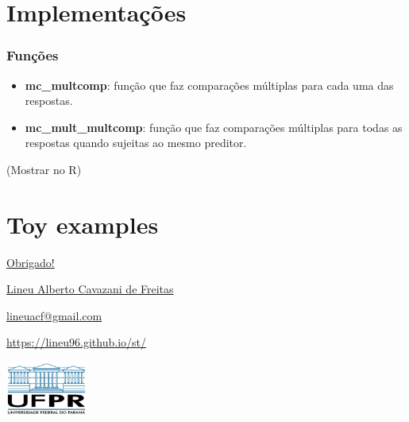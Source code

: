 \documentclass[10pt,
  aspectratio=169,
  serif,
  mathserif,
  professionalfont,
  compress,
  handout,
  ]{beamer}\usepackage[]{graphicx}\usepackage[]{color}
\begin{document}
\section{Implementações}

\begin{frame}

\frametitle{Funções}

\begin{itemize}
    \itemsep 2ex

  \item \textbf{mc\_multcomp}: função que faz comparações múltiplas para cada uma das respostas.
  
  \item \textbf{mc\_mult\_multcomp}: função que faz comparações múltiplas para todas as respostas quando sujeitas ao mesmo preditor.
  
\end{itemize}

\vspace{1cm}

(Mostrar no R)

\end{frame}

\section{Toy examples}

\begin{frame}[c, allowframebreaks]

\begin{center}

  {\huge \href{https://lineu96.github.io/st/}{Obrigado!}}
  
  \vspace{0.5cm}
    
  {\normalsize \href{https://lineu96.github.io/st/}{Lineu Alberto Cavazani de Freitas}}
  
  {\normalsize \href{https://lineu96.github.io/st/}{lineuacf@gmail.com}}
  
  {\normalsize \href{https://lineu96.github.io/st/}{https://lineu96.github.io/st/}}
  
\end{center}

\begin{center}
  \includegraphics[height=1.8cm]{img/ufpr-transparent.png}\hspace{2em}
\end{center}

\end{frame}

\end{document}
